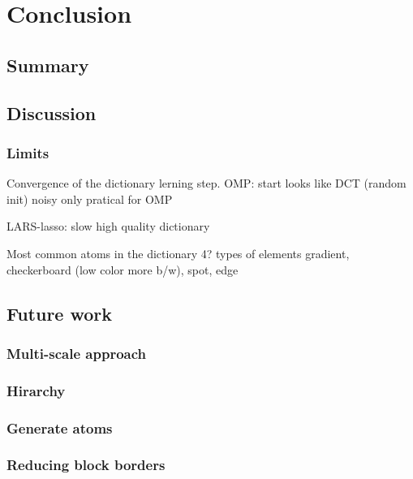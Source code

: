 \chapter{Conclusion}
\section{Summary} %

\section{Discussion}
\subsection*{Limits}
Convergence of the dictionary lerning step.
OMP:
  start looks like DCT (random init)
  noisy
  only pratical for OMP

LARS-lasso:
  slow 
  high quality dictionary

  Most common atoms in the dictionary 
  4? types of elements
  gradient, checkerboard (low color more b/w), spot, edge

\section{Future work}

\subsection*{Multi-scale approach}
\subsection*{Hirarchy}
\subsection*{Generate atoms}

\subsection*{Reducing block borders}
